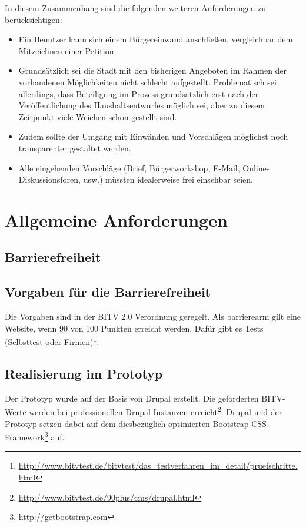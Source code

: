 \documentclass[11pt,a4paper,twoside]{article}
\begin{document}
In diesem Zusammenhang sind die folgenden weiteren Anforderungen zu
berücksichtigen: 
\begin{itemize}
\item Ein Benutzer kann sich einem Bürgereinwand anschließen, vergleichbar dem
  Mitzeichnen einer Petition.
\item Grundsätzlich sei die Stadt mit den bisherigen Angeboten im Rahmen der
  vorhandenen Möglichkeiten nicht schlecht aufgestellt. Problematisch sei
  allerdings, dass Beteiligung im Prozess grundsätzlich erst nach der
  Veröffentlichung des Haushaltsentwurfes möglich sei, aber zu diesem
  Zeitpunkt viele Weichen schon gestellt sind.
\item Zudem sollte der Umgang mit Einwänden und Vorschlägen möglichst noch
  transparenter gestaltet werden.
\item Alle eingehenden Vorschläge (Brief, Bürgerworkshop, E-Mail,
  Online-Diskussionsforen, usw.) müssten idealerweise frei einsehbar seien.
\end{itemize}

\section{Allgemeine Anforderungen} 

\subsection{Barrierefreiheit} 

\subsection*{Vorgaben für die Barrierefreiheit}

Die Vorgaben sind in der BITV 2.0 Verordnung geregelt.  Als barrierearm gilt
eine Website, wenn 90 von 100 Punkten erreicht werden.  Dafür gibt es Tests
(Selbsttest oder
Firmen)\footnote{\url{http://www.bitvtest.de/bitvtest/das_testverfahren_im_detail/pruefschritte.html}}.

\subsection*{Realisierung im Prototyp}

Der Prototyp wurde auf der Basis von Drupal erstellt.  Die geforderten
BITV-Werte werden bei professionellen Drupal-Instanzen
erreicht\footnote{\url{http://www.bitvtest.de/90plus/cms/drupal.html}}.
Drupal und der Prototyp setzen dabei auf dem diesbezüglich optimierten
Bootstrap-CSS-Framework\footnote{\url{http://getbootstrap.com}} auf.
\end{document}
